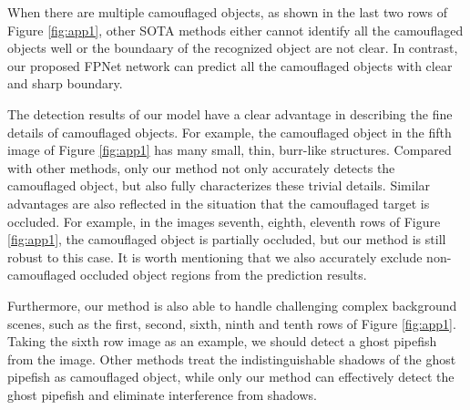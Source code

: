\documentclass[sigconf,screen]{acmart}
\begin{document}
When there are multiple camouflaged objects, as shown in the last two rows of Figure \ref{fig:app1}, other SOTA methods either cannot identify all the camouflaged objects well or the boundaary of the recognized object are not clear. 
In contrast, our proposed FPNet network can predict all the camouflaged objects with clear and sharp boundary. 


The detection results of our model have a clear advantage in describing the fine details of camouflaged objects. For example, the camouflaged object  in the fifth image of Figure \ref{fig:app1} has many small, thin, burr-like structures. Compared with other methods, only our method not only accurately detects the camouflaged object, but also fully characterizes these trivial details. 
Similar advantages are also reflected in the situation that the camouflaged target is occluded.
For example, in the images seventh, eighth, eleventh rows of Figure \ref{fig:app1}, the camouflaged object is partially occluded, but our method is still robust to this case. It is worth mentioning that we also accurately exclude non-camouflaged occluded object regions from the prediction results.


Furthermore, our method is also able to handle challenging complex background scenes, such as the first, second, sixth, ninth and tenth rows of Figure \ref{fig:app1}. 
Taking the sixth row image as an example, we should detect a ghost pipefish from the image. Other methods treat the indistinguishable shadows of the ghost pipefish as camouflaged object, while only our method can effectively detect the ghost pipefish and eliminate interference from shadows.
\end{document}
